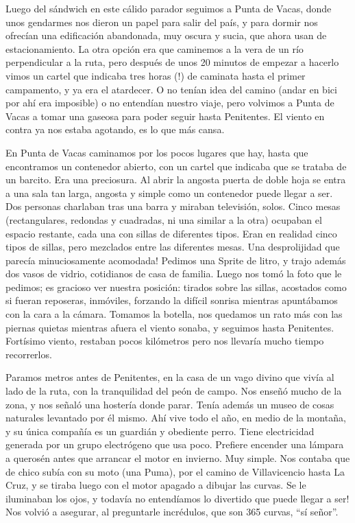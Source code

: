 Luego del s\'andwich en este c\'alido parador seguimos a Punta de Vacas, donde
unos gendarmes nos dieron un papel para salir del pa\'is, y para dormir nos
ofrec\'ian una edificaci\'on abandonada, muy oscura y sucia, que ahora usan de
estacionamiento. La otra opci\'on era que caminemos a la vera de un r\'io
perpendicular a la ruta, pero despu\'es de unos 20 minutos de empezar a hacerlo
vimos un cartel que indicaba tres horas (\textexclamdown !) de caminata hasta el
primer campamento, y ya era el atardecer. O no ten\'ian idea del camino (andar
en bici por ah\'i era imposible) o no entend\'ian nuestro viaje, pero volvimos a
Punta de Vacas a tomar una gaseosa para poder seguir hasta Penitentes. El viento
en contra ya nos estaba agotando, es lo que m\'as cansa.

En Punta de Vacas caminamos por los pocos lugares que hay, hasta que encontramos
un contenedor abierto, con un cartel que indicaba que se trataba de un barcito.
Era una preciosura. Al abrir la angosta puerta de doble hoja se entra a una sala
tan larga, angosta y simple como un contenedor puede llegar a ser. Dos personas
charlaban tras una barra y miraban televisi\'on, solos. Cinco mesas
(rectangulares, redondas y cuadradas, ni una similar a la otra) ocupaban el
espacio restante, cada una con sillas de diferentes tipos. Eran en realidad
cinco tipos de sillas, pero mezclados entre las diferentes mesas.
\textexclamdown Una desprolijidad que parec\'ia minuciosamente acomodada!
Pedimos una Sprite de litro, y trajo adem\'as dos vasos de vidrio, cotidianos de
casa de familia. Luego nos tom\'o la foto que le pedimos; es gracioso ver
nuestra posici\'on: tirados sobre las sillas, acostados como si fueran
reposeras, inm\'oviles, forzando la dif\'icil sonrisa mientras apunt\'abamos con
la cara a la c\'amara. Tomamos la botella, nos quedamos un rato m\'as con las
piernas quietas mientras afuera el viento sonaba, y seguimos hasta Penitentes.
Fort\'isimo viento, restaban pocos kil\'ometros pero nos llevar\'ia mucho tiempo
recorrerlos.

Paramos metros antes de Penitentes, en la casa de un vago divino que viv\'ia al
lado de la ruta, con la tranquilidad del pe\'on de campo. Nos ense\~n\'o mucho
de la zona, y nos se\~nal\'o una hoster\'ia donde parar. Ten\'ia adem\'as un
museo de cosas naturales levantado por \'el mismo. Ah\'i vive todo el a\~no, en
medio de la monta\~na, y su \'unica compa\~n\'ia es un guardi\'an y obediente
perro. Tiene electricidad generada por un grupo electr\'ogeno que usa poco.
Prefiere encender una l\'ampara a queros\'en antes que arrancar el motor en
invierno. Muy simple. Nos contaba que de chico sub\'ia con su moto (una Puma),
por el camino de Villavicencio hasta La Cruz, y se tiraba luego con el motor
apagado a dibujar las curvas. \textexclamdown Se le iluminaban los ojos, y
todav\'ia no entend\'iamos lo divertido que puede llegar a ser! Nos volvi\'o a
asegurar, al preguntarle incr\'edulos, que son 365 curvas, ``s\'i se\~nor''.

